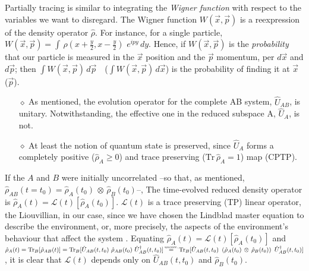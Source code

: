 \documentclass[11pt]{article}
\numberwithin{equation}{section} %
\numberwithin{figure}{section} %
\begin{document}
\begin{appendices}
\begin{itemize}
Partially tracing is similar to integrating the \emph{Wigner function} with respect to the variables we want to disregard. The Wigner function $W(\vec{x},\vec{p})$ is a reexpression of the density operator $\hat{\rho}$. \cite[p.~478, l.~1]{Feynman} For instance, for a single particle, $W(\vec{x},\vec{p}) = \int\,\rho(x+\frac{y}{2},x-\frac{y}{2})\,\,e^{ipy}\,dy$. Hence, if $W(\vec{x},\vec{p})$ is the \emph{probability} that our particle is measured in the  $\vec{x}$ position and the $\vec{p}$ momentum, per $d\vec{x}$ and $d\vec{p}$; then $\int W(\vec{x},\vec{p})\,d\vec{p}$ $\,\,$ ($\int W(\vec{x},\vec{p})\,d\vec{x}$) is the probability of finding it at $\vec{x}$ ($\vec{p}$). \\

\begin{itemize}
\item[$\diamond$] As mentioned, the evolution operator for the complete AB system, $\hat{U}_{AB}$, is unitary. Notwithstanding, the effective one in the reduced subspace A, $\hat{U}_A$, is not.
\item[$\diamond$] At least the notion of quantum state is preserved, since $\hat{U}_A$ forms a completely positive ($\hat{\rho}_A\geq 0$) and trace preserving ($\textrm{Tr}\,\hat{\rho}_A=1$) map (CPTP).
\end{itemize}

If the $A$ and $B$ were initially uncorrelated --so that, as mentioned, $\hat{\rho}_{AB}(t=t_0)=\hat{\rho}_A(t_0)\,\otimes\,\hat{\rho}_B(t_0)$--, The time-evolved reduced density operator is $\hat{\rho}_A(t)=\mathcal{L}(t)[\hat{\rho}_A(t_0)]$. $\mathcal{L}(t)$ is a trace preserving (TP) linear operator, the Liouvillian, in our case, since we have chosen the Lindblad master equation to describe the environment, or, more precisely, the aspects of the environment's behaviour that affect the system \cite[p.~1076, l.~94-95]{Lloyd}. Equating $\hat{\rho}_A(t)=\mathcal{L}(t)[\hat{\rho}_A(t_0)]$ and $\hat{\rho}_A(t)=\textrm{Tr}_B[\hat{\rho}_{AB}(t)]=\textrm{Tr}_B[\hat{U}_{AB}(t,t_0)\,\,\hat{\rho}_{AB}(t_0)\,\,\hat{U}_{AB}^\dagger(t,t_0)] \,\,\,\,\,\newcommand\myeq1{\mathrel{\stackrel{\makebox[0pt]{\mbox{\normalfont\tiny \textrm{uncorr.}}}}{=}}}\,\,\,\,\, \textrm{Tr}_B[\hat{U}_{AB}(t,t_0)\,\,\left(\hat{\rho}_A(t_0)\,\otimes\,\hat{\rho}_B(t_0)\right)\,\,\hat{U}_{AB}^\dagger(t,t_0)]$, it is clear that $\mathcal{L}(t)$ depends only on $\hat{U}_{AB}(t,t_0)$ and $\hat{\rho}_B(t_0)$.
\end{itemize}


\end{appendices}
\end{document}
